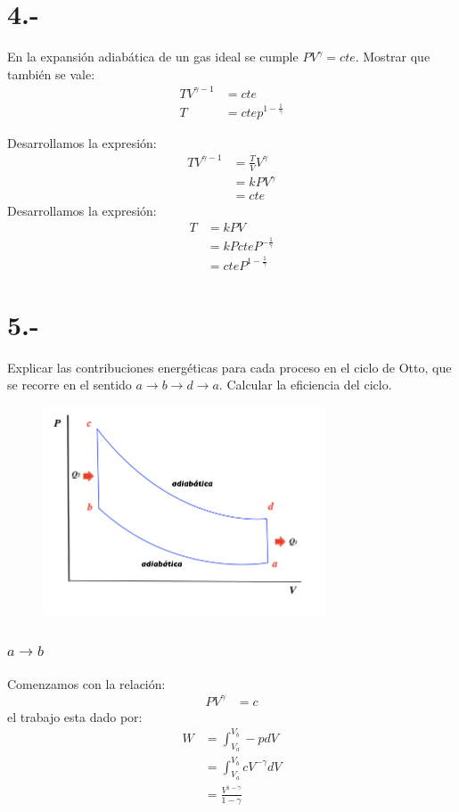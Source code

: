 \documentclass{article}
\begin{document}
\section*{4.-}
En la expansión adiabática de un gas ideal se cumple $PV^{\gamma} = cte$. Mostrar que también 
se vale:
\begin{align*}
    TV^{\gamma -1} &= cte \\
    T &= cte p^{1-\frac{1}{\gamma}}
\end{align*}
\begin{tcolorbox}[breakable]
    Desarrollamos la expresión:
    \begin{align*}
        TV^{\gamma-1} 
        &= \frac{T}{V}V^\gamma \\
        &= kPV^\gamma \\
        &= cte  
    \end{align*}
    Desarrollamos la expresión:
    \begin{align*}
        T 
        &= kPV \\
        &= kPcteP^{-\frac{1}{\gamma}} \\
        &= cteP^{1-\frac{1}{\gamma}} 
    \end{align*}
\end{tcolorbox}
\section*{5.-}
Explicar las contribuciones energéticas para cada proceso en el ciclo de Otto, que se 
recorre en el sentido $a \to b \to d \to a$. Calcular la eficiencia del ciclo.
\begin{figure}[H]
    \centering
    \includegraphics{images/p5_cycle.png}
\end{figure}
\begin{tcolorbox}[breakable]
    \subsubsection*{$a \to b$}
    Comenzamos con la relación:
    \begin{align*}
        PV^{\gamma} &= c
    \end{align*}
    el trabajo esta dado por:
    \begin{align*}
        W 
        &= \int_{V_a}^{V_b} -pdV \\
        &= \int_{V_a}^{V_b} cV^{-\gamma}dV \\
        &= \frac{V^{1-\gamma}}{1-\gamma} 
    \end{align*}
\end{tcolorbox}
\end{document}
